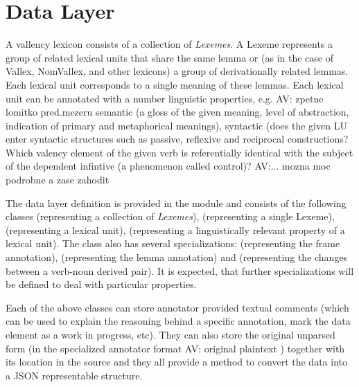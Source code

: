 \documentclass[10pt, a4paper, twocolumn]{article} %
\begin{document}
\section{Data Layer}
A vallency lexicon consists of a collection of \emph{Lexemes}. A Lexeme represents a group of related
lexical units that share the same lemma or (as in the case of Vallex, NomVallex, and other lexicons) a group of derivationally related lemmas. Each lexical unit corresponds to a single meaning of these lemmas. Each lexical unit can be annotated
with a number linguistic properties,
e.g. AV: zpetne lomitko pred.mezeru
semantic (a gloss of the given meaning, level of abstraction, 
indication of primary and metaphorical meanings),
syntactic (does the given LU enter syntactic structures such as passive, reflexive and reciprocal constructions? Which valency element of the given verb is referentially identical with the subject of the dependent infintive (a phenomenon called control)?
AV:... mozna moc podrobne a zase zahodit

The data layer definition is provided in the  module and consists of the
following classes  (representing a collection of \emph{Lexemes}),  (representing
a single Lexeme),  (representing a lexical unit),  (representing a linguistically
relevant property of a lexical unit). The  class also has several specializations: 
(representing the frame annotation),  (representing the lemma annotation) and 
(representing the changes between a verb-noun derived pair). It is expected, that further specializations
will be defined to deal with particular properties.

Each of the above classes can store annotator provided textual comments (which can be used to explain
the reasoning behind a specific annotation, mark the data element as a work in progress, etc). They can also
store the original unparsed form (in the specialized annotator format
AV: original plaintext
) together with its location in the
source and they all provide a method to convert the data into a JSON representable structure.

\end{document}
